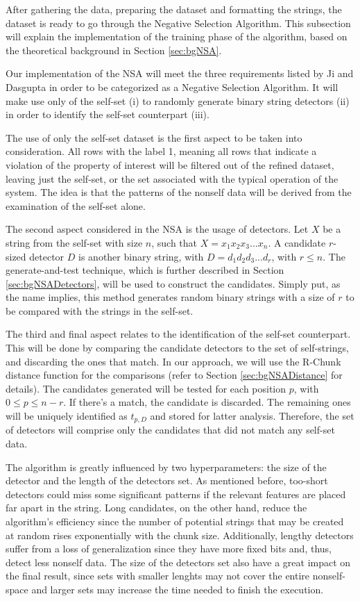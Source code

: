 After gathering the data, preparing the dataset and formatting the strings, the dataset is ready to go through the Negative Selection Algorithm. This subsection will explain the implementation of the training phase of the algorithm, based on the theoretical background in Section \ref{sec:bgNSA}.

Our implementation of the NSA will meet the three requirements listed by Ji and Dasgupta \cite{RevisitingNSA2007} in order to be categorized as a Negative Selection Algorithm. It will make use only of the self-set (i) to randomly generate binary string detectors (ii) in order to identify the self-set counterpart (iii).

The use of only the self-set dataset is the first aspect to be taken into consideration. All rows with the label 1, meaning all rows that indicate a violation of the property of interest will be filtered out of the refined dataset, leaving just the self-set, or the set associated with the typical operation of the system. The idea is that the patterns of the nonself data will be derived from the examination of the self-set alone.

The second aspect considered in the NSA is the usage of detectors. Let \(X\) be a string from the self-set with size \(n\), such that \(X = x_1x_2x_3...x_n\). A candidate \(r\)-sized detector \(D\) is another binary string, with \(D = d_1d_2d_3...d_r\), with \(r \leq n\). The generate-and-test technique, which is further described in Section \ref{sec:bgNSADetectors}, will be used to construct the candidates. Simply put, as the name implies, this method generates random binary strings with a size of \(r\) to be compared with the strings in the self-set. 

The third and final aspect relates to the identification of the self-set counterpart. This will be done by comparing the candidate detectors to the set of self-strings, and discarding the ones that match. In our approach, we will use the R-Chunk distance function for the comparisons (refer to Section \ref{sec:bgNSADistance} for details). The candidates generated will be tested for each position \(p\), with \(0 \leq p \leq n-r\). If there's a match, the candidate is discarded. The remaining ones will be uniquely identified as \(t_{p, D}\) and stored for latter analysis. Therefore, the set of detectors will comprise only the candidates that did not match any self-set data.

The algorithm is greatly influenced by two hyperparameters: the size of the detector and the length of the detectors set. As mentioned before, too-short detectors could miss some significant patterns if the relevant features are placed far apart in the string. Long candidates, on the other hand, reduce the algorithm's efficiency since the number of potential strings that may be created at random rises exponentially with the chunk size. Additionally, lengthy detectors suffer from a loss of generalization since they have more fixed bits and, thus, detect less nonself data. The size of the detectors set also have a great impact on the final result, since sets with smaller lenghts may not cover the entire nonself-space and larger sets may increase the time needed to finish the execution. 

